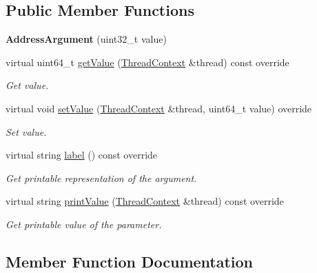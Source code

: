 \subsection*{Public Member Functions}
\begin{DoxyCompactItemize}
\item 
\mbox{\label{struct_evm_1_1_argument_1_1_address_argument_a156c0673b4d0fa8e02bcd5814e24d868}} 
{\bfseries Address\+Argument} (uint32\+\_\+t value)
\item 
virtual uint64\+\_\+t \mbox{\hyperlink{struct_evm_1_1_argument_1_1_address_argument_a8dfdf1626e06e7c72af39ca3f09ecec7}{get\+Value}} (\mbox{\hyperlink{struct_evm_1_1_thread_context}{Thread\+Context}} \&thread) const override
\begin{DoxyCompactList}\small\item\em Get value. \end{DoxyCompactList}\item 
virtual void \mbox{\hyperlink{struct_evm_1_1_argument_1_1_address_argument_a2fa90885150424134b181ff01704e798}{set\+Value}} (\mbox{\hyperlink{struct_evm_1_1_thread_context}{Thread\+Context}} \&thread, uint64\+\_\+t value) override
\begin{DoxyCompactList}\small\item\em Set value. \end{DoxyCompactList}\item 
virtual string \mbox{\hyperlink{struct_evm_1_1_argument_1_1_address_argument_a4a8ca0f63e6139140f924c2cab9b3d40}{label}} () const override
\begin{DoxyCompactList}\small\item\em Get printable representation of the argument. \end{DoxyCompactList}\item 
virtual string \mbox{\hyperlink{struct_evm_1_1_argument_1_1_address_argument_afaefa598d24c588a0047df1b88033bbd}{print\+Value}} (\mbox{\hyperlink{struct_evm_1_1_thread_context}{Thread\+Context}} \&thread) const override
\begin{DoxyCompactList}\small\item\em Get printable value of the parameter. \end{DoxyCompactList}\end{DoxyCompactItemize}


\subsection{Member Function Documentation}
\mbox{\label{struct_evm_1_1_argument_1_1_address_argument_a8dfdf1626e06e7c72af39ca3f09ecec7}} 
